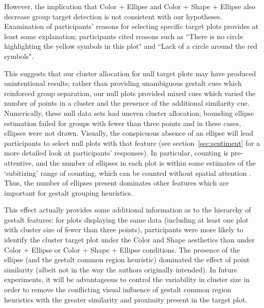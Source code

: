 \documentclass[12pt]{article}\usepackage[]{graphicx}\usepackage[]{color}
\newcommand{\newdo}[1]{\todo[inline, color=Lime]{#1}} %
\begin{document}
\begin{appendix}
However, the implication that Color + Ellipse and Color + Shape + Ellipse also decrease group target detection is not consistent with our hypotheses. Examination of participants' reasons for selecting specific target plots provides at least some explanation; participants cited reasons such as 
``There is no circle highlighting the yellow symbols in this plot" %
and 
``Lack of a circle around the red symbols".  %

This suggests that our cluster allocation for null target plots may have produced unintentional results; rather than providing unambiguous gestalt cues which reinforced group separation, our null plots provided mixed cues which varied the number of points in a cluster and the presence of the additional similarity cue. 
Numerically, these null data sets had uneven cluster allocation; bounding ellipse estimation failed for groups with fewer than three points and in these cases, ellipses were not drawn. 
Visually, the conspicuous absence of an ellipse will lead participants to select null plots with that feature (see section~\ref{sec:sentiment} for a more detailed look at participants' responses).
In particular, counting is pre-attentive, and the number of ellipses in each plot is within some estimates of the `subitizing' range of counting, which can be counted without spatial attention \citep{trick1994small}. Thus, the number of ellipses present dominates other features which are important for gestalt grouping heuristics. 


This effect actually provides some additional information as to the hierarchy of gestalt features: for plots displaying the same data (including at least one plot with cluster size of fewer than three points), participants were more likely to identify the cluster target plot under the Color and Shape aesthetics than under Color + Ellipse or Color + Shape + Ellipse conditions. 
The presence of the ellipse (and the gestalt common region heuristic) dominated the effect of point similarity (albeit not in the way the authors originally intended). 
In future experiments, it will be advantageous to control the variability in cluster size in order to remove the conflicting visual influence of gestalt common region heuristics with the greater similarity and proximity present in the target plot. 


\end{appendix}
\end{document}
